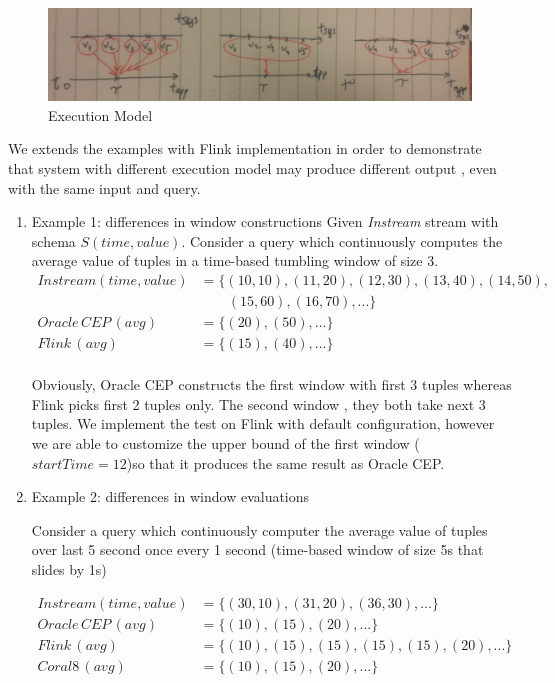 	\begin{figure}[htbp!] 
\centering    
\includegraphics[width=1\textwidth]{executionModel}
\caption{Execution Model}
\label{fig:executionModel}
\end{figure}


We extends the examples \citep{Dindar:2013} with Flink implementation in order to demonstrate that system with different execution model may produce different output , even with the same input and query. 
\begin{enumerate}

\item Example 1: differences in window constructions
Given \textit{Instream} stream with schema $S(time, value)$. Consider a query which continuously computes the average value of tuples in a time-based tumbling window of size 3.
\begin{align*}
Instream(time,value) &= \{(10,10),(11,20),(12,30),(13,40),(14,50),\\
&\qquad (15,60),(16,70),...\} \\
Oracle\, CEP\, (avg)		&= \{(20), (50),...\} \\
Flink\, (avg)			&= \{(15), (40),...\} \\
\end{align*}

Obviously, Oracle CEP constructs the first window with first 3 tuples whereas Flink picks first 2 tuples only. The second window , they both take next 3 tuples. We implement the test on Flink with default configuration, however we are able to customize the upper bound of the first window ($startTime = 12$)so that it produces the same result as Oracle CEP.


\item Example 2: differences in window evaluations

Consider a query which continuously computer the average value of tuples over last 5 second once every 1 second (time-based window of size 5s that slides by 1s)

\begin{align*}
Instream(time,value) 	&= \{(30,10),(31,20),(36,30),...\} \\
Oracle\, CEP\, (avg)		&= \{(10), (15),(20),...\} \\
Flink\, (avg)			&= \{(10), (15), (15), (15), (15), (20),...\}\\
Coral8\, (avg)			&= \{(10), (15),(20),...\}			
\end{align*}


\end{enumerate}
